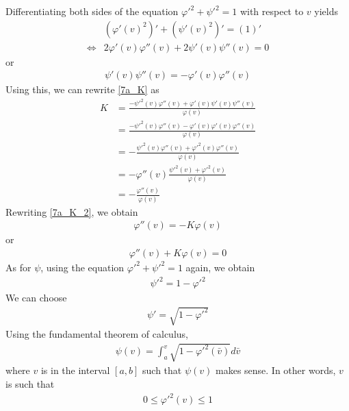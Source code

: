 \documentclass[a4paper]{report}
\begin{document}
Differentiating both sides of the equation ${\varphi'}^2 + {\psi'}^2 = 1$ with respect to $v$ yields
\begin{align}
	&\left({\varphi'(v)}^2\right)' + \left({\psi'(v)}^2\right)' =(1)'\\
	\Longleftrightarrow& 2\varphi'(v)\varphi''(v) + 2\psi'(v) \psi''(v) = 0
\end{align}
or
\begin{align}
  \psi'(v) \psi''(v) = -\varphi'(v)\varphi''(v) 
\end{align}
Using this, we can rewrite \eqref{7a_K} as
\begin{align}
	K &= \frac{-{\psi'}^2(v) \varphi''(v) + \varphi'(v) \psi'(v)  \psi''(v) }{\varphi(v)}\\
	 &= \frac{-{\psi'}^2(v) \varphi''(v) - \varphi'(v)  \varphi'(v)\varphi''(v)  }{\varphi(v)}\\
	 &= -\frac{{\psi'}^2(v) \varphi''(v) + {\varphi'}^2(v)  \varphi''(v)  }{\varphi(v)}\\
	 &= -\varphi''(v) \frac{{\psi'}^2(v)  + {\varphi'}^2(v) }{\varphi(v)}\\
	 &= - \frac{\varphi''(v)}{\varphi(v)}\label{7a_K_2}
\end{align}
Rewriting \eqref{7a_K_2}, we obtain
\begin{align}
	\varphi''(v) = -K\varphi(v)
\end{align}
or
\begin{align}
	\varphi''(v) + K\varphi(v) = 0 \label{7a_result1}
\end{align}
As for $\psi$, using the equation ${\varphi'}^2 + {\psi'}^2 = 1$ again, we obtain
\begin{align}
	 {\psi'}^2 = 1 - {\varphi'}^2 
\end{align}
We can choose
\begin{align}
	\psi' = \sqrt{1 - {\varphi'}^2}
\end{align}
Using the fundamental theorem of calculus,
\begin{align}
	\psi(v) = \int_{a}^{v} \sqrt{1 - {\varphi'}^2(\bar{v})} d\bar{v}
\end{align}
where $v$ is in the interval $[a,b]$ such that $\psi(v)$ makes sense. In other words, $v$ is such that
\begin{align}
	0 \leq {\varphi'}^2(v) \leq 1
\end{align}
\end{document}
